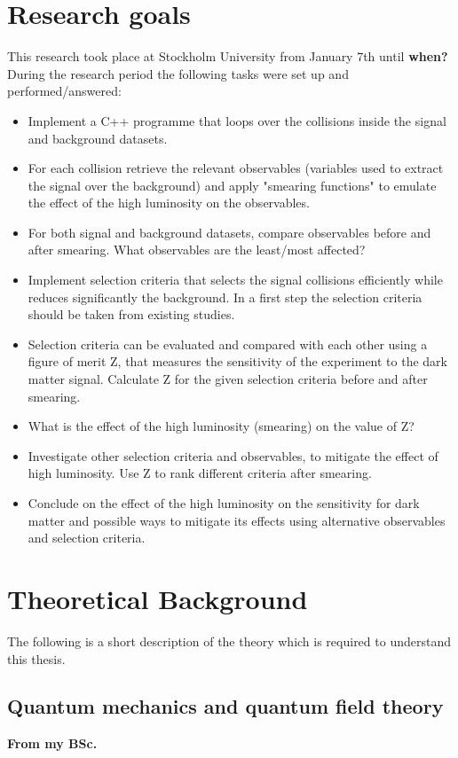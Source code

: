\section{Research goals}\label{sec:goals}
This research took place at Stockholm University from January 7th until \textbf{when?}
During the research period the following tasks were set up and performed/answered:
\begin{itemize}
\item Implement a C++ programme that loops over the collisions inside the signal and background datasets.	
\item For each collision retrieve the relevant observables (variables used to	 extract the signal over the background) and apply "smearing functions" to emulate the effect of the high luminosity on the observables. 	
\item For both signal and background datasets, compare observables before and after smearing. What observables are the least/most affected?	
\item Implement selection criteria that selects the signal collisions efficiently while reduces significantly the background. In a first step the selection criteria should be taken from existing studies.
\item Selection criteria can be evaluated and compared with each other using a figure of merit Z, that measures the sensitivity of the experiment to the	 dark matter signal. Calculate Z for the given selection criteria before and after smearing.
\item What is the effect of the high luminosity (smearing) on the value of Z?
\item Investigate other selection criteria and observables, to mitigate the effect of high luminosity. Use Z to rank different criteria after smearing.
\item Conclude on the effect of the high luminosity on the sensitivity for dark matter and possible ways to mitigate its effects using alternative observables and selection criteria. 
\end{itemize}
\newpage
\section{Theoretical Background}\label{sec:tb}
The following is a short description of the theory which is required to understand this thesis. 
\subsection{Quantum mechanics and quantum field theory}\label{sec:qm}
\textbf{From my BSc.}

